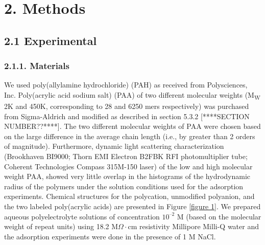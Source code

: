\documentclass[journal=mamobx,manuscript=article]{achemso}
\begin{document}
\section{2. Methods}  %
     \label{sec-methods}
     
\subsection{2.1 Experimental}  %
    \label{sec-meth-exp}

\subsubsection{2.1.1. Materials}   %
       \label{sec-materials}

We used poly(allylamine hydrochloride) (PAH) as received from Polysciences, Inc. Poly(acrylic acid sodium salt) (PAA) of two different molecular weights (M\textsubscript{W} 2K and 450K, corresponding to 28 and 6250 mers respectively) was purchased from Sigma-Aldrich and modified as described in section 5.3.2 
[****SECTION NUMBER??****].  The two different molecular weights of PAA were chosen based on the large difference in the average chain length (i.e., by greater than 2 orders of magnitude).  Furthermore, dynamic light scattering characterization (Brookhaven BI9000; Thorn EMI Electron B2FBK RFI photomultiplier tube; Coherent Technologies Compass 315M-150 laser) of the low and high molecular weight PAA, showed very little overlap in the histograms of the hydrodynamic radius of the polymers under the solution conditions used for the adsorption experiments.  Chemical structures for the polycation, unmodified polyanion, 
and the two labeled poly(acrylic acids) are presented in Figure \ref{figure 1}.  We prepared aqueous polyelectrolyte solutions of concentration $10^{–2}$ M (based on the molecular weight of repeat units) using 18.2 M$\Omega\cdot$cm resistivity Millipore Milli-Q water and the adsorption experiments were done in the presence of 1 M NaCl.
%
\end{document}
